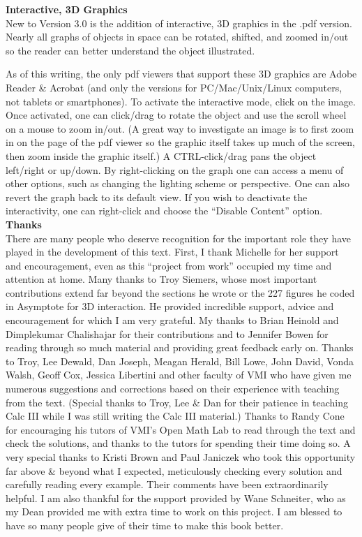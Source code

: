 \thispagestyle{empty}
\noindent\textbf{\large Interactive, 3D Graphics}\\

New to Version 3.0 is the addition of interactive, 3D graphics in the .pdf version. Nearly all graphs of objects in space can be rotated, shifted, and zoomed in/out so the reader can better understand the object illustrated. 

As of this writing, the only pdf viewers that support these 3D graphics are Adobe Reader \& Acrobat (and only the versions for PC/Mac/Unix/Linux computers, not tablets or smartphones). To activate the interactive mode, click on the image. Once activated, one can click/drag to rotate the object and use the scroll wheel on a mouse to zoom in/out. (A great way to investigate an image is to first zoom in on the page of the pdf viewer so the graphic itself takes up much of the screen, then zoom inside the graphic itself.) A CTRL-click/drag pans the object left/right or up/down. By right-clicking on the graph one can access a menu of other options, such as changing the lighting scheme or perspective. One can also revert the graph back to its default view. If you wish to deactivate the interactivity, one can right-click and choose the ``Disable Content'' option. \\

\noindent\textbf{\large Thanks}\\

There are many people who deserve recognition for the important role they have played in the development of this text. First, I thank Michelle for her support and encouragement, even as this ``project from work'' occupied my time and attention at home. Many thanks to Troy Siemers, whose most important contributions extend far beyond the sections he wrote or the 227 figures he coded in Asymptote for 3D interaction.  He provided incredible support, advice and encouragement for which I am very grateful. My thanks to Brian Heinold and Dimplekumar Chalishajar for their contributions and to Jennifer Bowen for reading through so much material and providing great feedback early on. Thanks to Troy, Lee Dewald, Dan Joseph, Meagan Herald, Bill Lowe, John David, Vonda Walsh, Geoff Cox, Jessica Libertini and other faculty of VMI who have given me numerous suggestions and corrections based on their experience with teaching from the text. (Special thanks to Troy, Lee \& Dan for their patience in teaching Calc III while I was still writing the Calc III material.) Thanks to Randy Cone for encouraging his tutors of VMI's Open Math Lab to read through the text and check the solutions, and thanks to the tutors for spending their time doing so. A very special thanks to Kristi Brown and Paul Janiczek who took this opportunity far above \& beyond what I expected, meticulously checking every solution and carefully reading every example. Their comments have been extraordinarily helpful. I am also thankful for the support provided by Wane Schneiter, who as my Dean provided me with extra time to work on this project. I am blessed to have so many people give of their time to make this book better.\\

